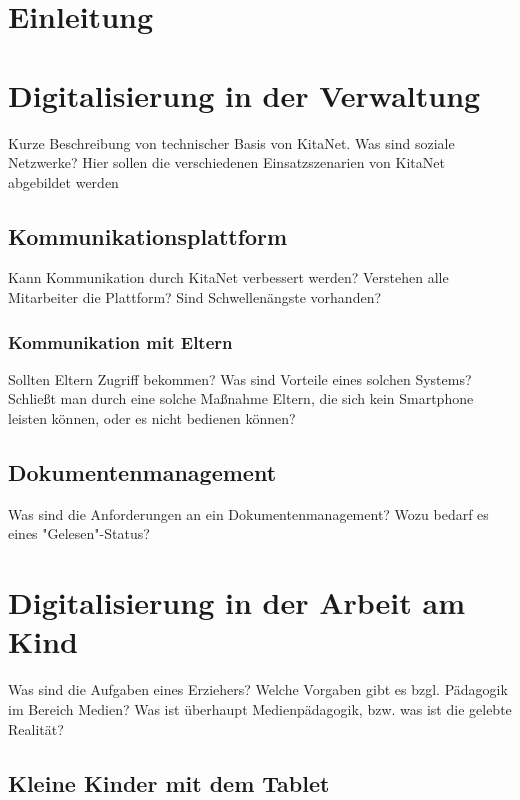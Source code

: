 

\chapter{Einleitung}
\label{sec:Einleitung}

\blindtext


\chapter{Digitalisierung in der Verwaltung}

Kurze Beschreibung von technischer Basis von KitaNet. Was sind soziale Netzwerke?
Hier sollen die verschiedenen Einsatzszenarien von KitaNet abgebildet werden

\section{Kommunikationsplattform}
Kann Kommunikation durch KitaNet verbessert werden? Verstehen alle Mitarbeiter die Plattform?
Sind Schwellenängste vorhanden?

\subsection{Kommunikation mit Eltern}
Sollten Eltern Zugriff bekommen? Was sind Vorteile eines solchen Systems? Schließt man durch eine solche Maßnahme Eltern, die sich kein Smartphone leisten können, oder es nicht bedienen können?

\section{Dokumentenmanagement}

Was sind die Anforderungen an ein Dokumentenmanagement? 
Wozu bedarf es eines "Gelesen"-Status? 

\chapter{Digitalisierung in der Arbeit am Kind}

Was sind die Aufgaben eines Erziehers? Welche Vorgaben gibt es bzgl. Pädagogik im Bereich Medien?
Was ist überhaupt Medienpädagogik, bzw. was ist die gelebte Realität?

\section{Kleine Kinder mit dem Tablet}

